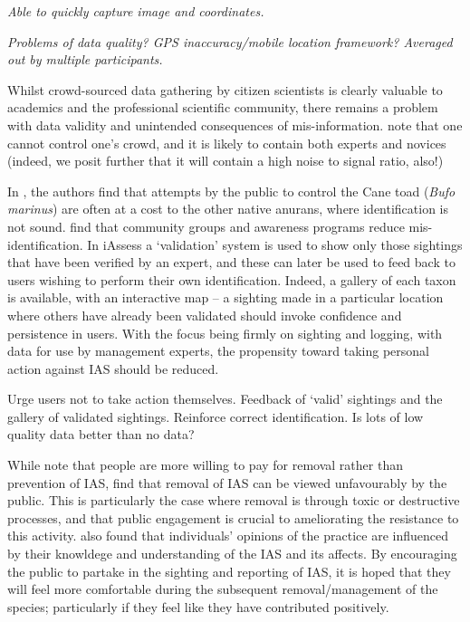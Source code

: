\documentclass[10pt,psfig,letterpaper,twocolumn]{article}
\begin{document}
\emph{Able to quickly capture image and coordinates. }

\emph{Problems of data quality? GPS inaccuracy/mobile location framework? Averaged out by multiple participants.}

Whilst crowd-sourced data gathering by citizen scientists is clearly valuable to academics and the professional scientific community, there remains a problem with data validity and unintended consequences of mis-information. \citet{Schenk:2009ud} note that one cannot control one's crowd, and it is likely to contain both experts and novices (indeed, we posit further that it will contain a high noise to signal ratio, also!) 

In \citet{Somaweera:2010vi}, the authors find that attempts by the public to control the Cane toad (\emph{Bufo marinus}) are often at a cost to the other native anurans, where identification is not sound. \citet{Somaweera:2010vi} find that community groups and awareness programs reduce mis-identification. In iAssess a `validation' system is used to show only those sightings that have been verified by an expert, and these can later be used to feed back to users wishing to perform their own identification. Indeed, a gallery of each taxon is available, with an interactive map -- a sighting made in a particular location where others have already been validated should invoke confidence and persistence in users. With the focus being firmly on sighting and logging, with data for use by management experts, the propensity toward taking personal action against IAS should be reduced. 

 Urge users not to take action themselves. Feedback of `valid' sightings and the gallery of validated sightings. Reinforce correct identification.
Is lots of low quality data better than no data?

While \citet{GarciaLlorente:vx} note that people are more willing to pay for removal rather than prevention of IAS, \citet{Sharp:2011eh} find that removal of IAS can be viewed unfavourably by the public. This is particularly the case where removal is through toxic or destructive processes, and that public engagement is crucial to ameliorating the resistance to this activity. \citet{GarciaLlorente:vx} also found that individuals' opinions of the practice are influenced by their knowldege and understanding of the IAS and its affects. By encouraging the public to partake in the sighting and reporting of IAS, it is hoped that they will feel more comfortable during the subsequent removal/management of the species; particularly if they feel like they have contributed positively. 
\end{document}
